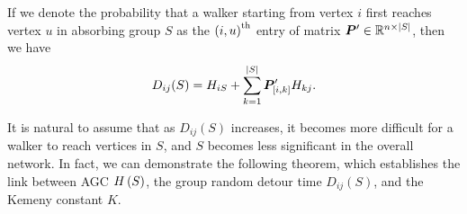 \documentclass[journal]{IEEEtran}
\begin{document}
\begin{definition}\label{def:detour-multiple}
    If we denote the probability that a walker starting from vertex \(i\) first reaches vertex \(u\) in absorbing group \(S\) as the \({(i,u)}^{\rm{th}}\) entry of matrix \(\boldsymbol{P}'\in\mathbb{R}^{n\times\left|S \right|}\), then we have
    \begin{equation*}
        D_{ij}(S)= H_{iS}+\sum_{k=1}^{\left|S \right|}\boldsymbol{P}'_{[i,k]}H_{kj}.
    \end{equation*}
\end{definition}

It is natural to assume that as \(D_{ij}(S)\) increases, it becomes more difficult for a walker to reach vertices in \(S\), and \(S\) becomes less significant in the overall network. In fact, we can demonstrate the following theorem, which establishes the link between AGC \(H\left(S\right)\), the group random detour time \(D_{ij}(S)\), and the Kemeny constant \(K\).
\end{document}
